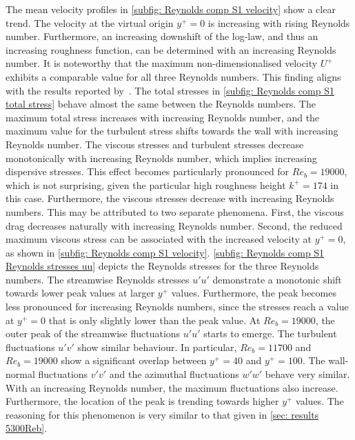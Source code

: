 The mean velocity profiles in \autoref{subfig: Reynolds comp S1 velocity} show a clear trend.
The velocity at the virtual origin $y^+ = 0$ is increasing with rising Reynolds number.
Furthermore, an increasing downshift of the log-law, and thus an increasing roughness function, can be determined with an increasing Reynolds number.
It is noteworthy that the maximum non-dimensionalised velocity $U^+$ exhibits a comparable value for all three Reynolds numbers. 
This finding aligns with the results reported by~\cite{demaioDirectNumericalSimulation2023}.
The total stresses in \autoref{subfig: Reynolds comp S1 total stress} behave almost the same between the Reynolds numbers.
The maximum total stress increases with increasing Reynolds number, and the maximum value for the turbulent stress shifts towards the wall with increasing Reynolds number.
The viscous stresses and turbulent stresses decrease monotonically with increasing Reynolds number, which implies increasing dispersive stresses.
This effect becomes particularly pronounced for $Re_b = 19000$, which is not surprising, given the particular high roughness height $k^+ = 174$ in this case.
Furthermore, the viscous stresses decrease with increasing Reynolds numbers.
This may be attributed to two separate phenomena.
First, the viscous drag decreases naturally with increasing Reynolds number.
Second, the reduced maximum viscous stress can be associated with the increased velocity at $y^+ = 0$, as shown in \autoref{subfig: Reynolds comp S1 velocity}.
\autoref{subfig: Reynolds comp S1 Reynolds stresses uu} depicts the Reynolds stresses for the three Reynolds numbers.
The streamwise Reynolds stresses $u'u'$ demonstrate a monotonic shift towards lower peak values at larger $y^+$ values.
Furthermore, the peak becomes less pronounced for increasing Reynolds numbers, since the stresses reach a value at $y^+ = 0$ that is only slightly lower than the peak value.
At $Re_b = 19000$, the outer peak of the streamwise fluctuations $u'u'$ starts to emerge.
The turbulent fluctuations $u'v'$ show similar behaviour.
In particular, $Re_b = 11700$ and $Re_b = 19000$ show a significant overlap between $y^+ = 40$ and $y^+ = 100$.
The wall-normal fluctuations $v'v'$ and the azimuthal fluctuations $w'w'$ behave very similar.
With an increasing Reynolds number, the maximum fluctuations also increase.
Furthermore, the location of the peak is trending towards higher $y^+$ values.
The reasoning for this phenomenon is very similar to that given in \autoref{sec: results 5300Reb}.

